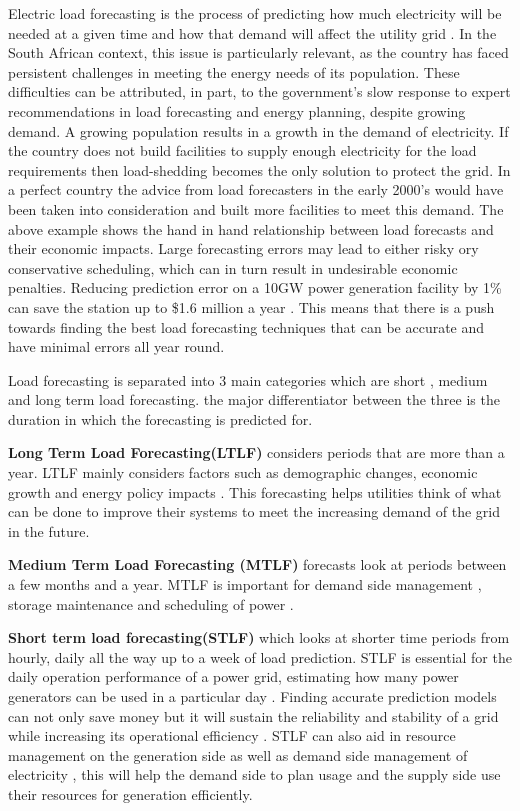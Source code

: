 Electric load forecasting is the process of predicting how much electricity will be needed at a given time and how that demand will affect the utility grid \cite{IBM_loadforecasting}. In the South African context, this issue is particularly relevant, as the country has faced persistent challenges in meeting the energy needs of its population. These difficulties can be attributed, in part, to the government’s slow response to expert recommendations in load forecasting and energy planning, despite growing demand. A growing population results in a growth in the demand of electricity. If the country does not build facilities to supply enough electricity for the load requirements then  load-shedding becomes the only solution to protect the grid. In a perfect country the advice from load forecasters in the early 2000's would have been taken into consideration and built more facilities to meet this demand.
The above example shows the hand in hand relationship between load forecasts and their economic impacts. Large forecasting errors may lead to either risky ory conservative
scheduling, which can in turn result in undesirable economic penalties\cite{festas2001computational}. Reducing prediction error on a 10GW power generation facility by 1\% can save the station up to  \$1.6 million a year \cite{wang2023short}. This means that there is a push towards finding the best load forecasting techniques that can be accurate and have minimal errors all year round.

Load forecasting is separated into 3 main categories which are short , medium and long term load forecasting. the major differentiator between the three is the duration in which the forecasting is predicted for.

\textbf{Long Term Load Forecasting(LTLF)} considers periods that are more than a year. LTLF mainly considers factors such as demographic changes, economic growth and energy policy impacts \cite{IBM_loadforecasting}. This forecasting helps utilities think of what can be done to improve their systems to meet the increasing demand of the grid in the future.

\textbf{Medium Term Load Forecasting (MTLF)} forecasts look at periods between a few months and a year. MTLF is important for demand side management  , storage maintenance and scheduling of power \cite{han2018enhanced}.

\textbf{Short term load forecasting(STLF)} which looks at shorter time periods from hourly, daily all the way up to a week of load prediction. STLF is essential for the daily operation performance of a power grid, estimating how many power generators can be used in a particular day \cite{shohan2022forecasting}. Finding accurate prediction models can not only save money but it will sustain the reliability and stability of a grid while increasing its operational efficiency \cite{wu2020short}. STLF can also aid in resource management on the generation side as well as demand side management of electricity \cite{rafi2021short}, this will help the demand side to plan usage and the supply side use their resources for generation efficiently.

